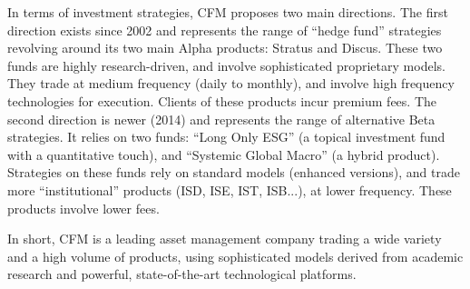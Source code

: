 In terms of investment strategies, CFM proposes two main directions. The first direction exists since 2002 and represents the range of ``hedge fund'' strategies revolving around its two main Alpha products: Stratus and Discus. These two funds are highly research-driven, and involve sophisticated proprietary models. They trade at medium frequency (daily to monthly), and involve high frequency technologies for execution. Clients of these products incur premium fees. The second direction is newer (2014) and represents the range of alternative Beta strategies. It relies on two funds: ``Long Only ESG'' (a topical investment fund with a quantitative touch), and ``Systemic Global Macro'' (a hybrid product). Strategies on these funds rely on standard models (enhanced versions), and trade more ``institutional'' products (ISD, ISE, IST, ISB...), at lower frequency. These products involve lower fees.

In short, CFM is a leading asset management company trading a wide variety and a high volume of products, using sophisticated models derived from academic research and powerful, state-of-the-art technological platforms.





